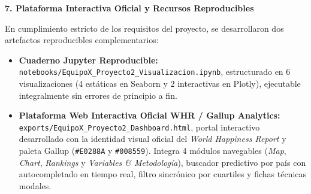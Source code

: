 \documentclass[9pt,a4paper]{article}
\newcommand{\customsection}[1]{%
  \vspace{0.2em}%
  {\small\bfseries\color{whrmagenta}#1}%
  \vspace{0.05em}\par%
}
\begin{document}
\customsection{7. Plataforma Interactiva Oficial y Recursos Reproducibles}
En cumplimiento estricto de los requisitos del proyecto, se desarrollaron dos artefactos reproducibles complementarios:
\begin{itemize}[leftmargin=1.1em, itemsep=0.1em]
    \item \textbf{Cuaderno Jupyter Reproducible:} \texttt{notebooks/EquipoX\_Proyecto2\_Visualizacion.ipynb}, estructurado en 6 visualizaciones (4 estáticas en Seaborn y 2 interactivas en Plotly), ejecutable integralmente sin errores de principio a fin.
    \item \textbf{Plataforma Web Interactiva Oficial WHR / Gallup Analytics:} \texttt{exports/EquipoX\_Proyecto2\_Dashboard.html}, portal interactivo desarrollado con la identidad visual oficial del \textit{World Happiness Report} y paleta Gallup (\texttt{\#E0288A} y \texttt{\#008559}). Integra 4 módulos navegables (\textit{Map}, \textit{Chart}, \textit{Rankings} y \textit{Variables \& Metodología}), buscador predictivo por país con autocompletado en tiempo real, filtro sincrónico por cuartiles y fichas técnicas modales.
\end{itemize}
\end{document}
